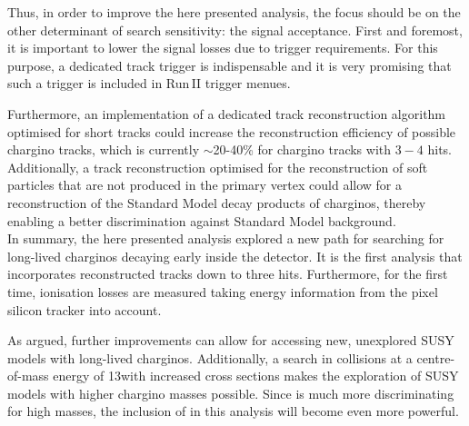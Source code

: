 Thus, in order to improve the here presented analysis, the focus should be on the other determinant of search sensitivity: the signal acceptance.
First and foremost, it is important to lower the signal losses due to trigger requirements.
For this purpose, a dedicated track trigger is indispensable and it is very promising that such a trigger is included in Run\,II trigger menues.

Furthermore, an implementation of a dedicated track reconstruction algorithm optimised for short tracks could increase the reconstruction efficiency of possible chargino tracks, which is currently $\sim$20-40\% for chargino tracks with $3-4$ hits.
Additionally, a track reconstruction optimised for the reconstruction of soft particles that are not produced in the primary vertex could allow for a reconstruction of the Standard Model decay products of charginos, thereby enabling a better discrimination against Standard Model background.\\


In summary, the here presented analysis explored a new path for searching for long-lived charginos decaying early inside the detector.
It is the first analysis that incorporates reconstructed tracks down to three hits.
Furthermore, for the first time, ionisation losses are measured taking energy information from the pixel silicon tracker into account.

As argued, further improvements can allow for accessing new, unexplored SUSY models with long-lived charginos.
Additionally, a search in collisions at a centre-of-mass energy of 13\tev with increased cross sections makes the exploration of SUSY models with higher chargino masses possible.
Since \dedx is much more discriminating for high masses, the inclusion of \dedx in this analysis will become even more powerful. 






